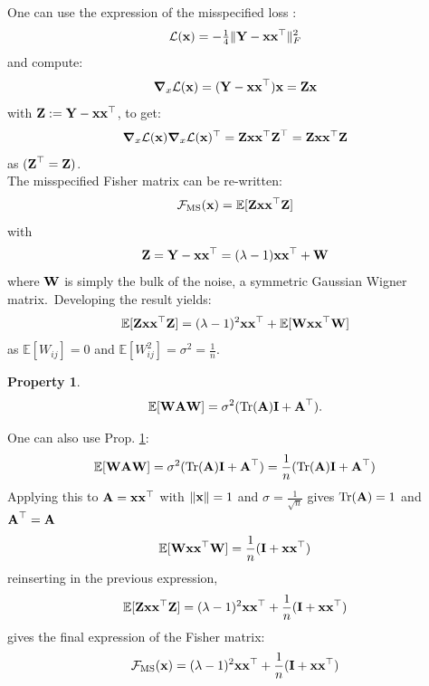 \documentclass[11pt]{article}
\newtheorem{property}{Property}
\begin{document}
\begin{rem}
One can use the expression of the misspecified loss :
\[
    \mathcal{L}(\vect{x}) = -\tfrac{1}{4} \|\vect Y - \vect{x}\vect{x}^\top\|_F^2
\]
and compute:
\[
    \vect \nabla_x \mathcal{L}(\vect{x}) = (\vect Y - \vect{x} \vect{x}^\top) \vect{x} = \vect Z\vect{x}
\]
with $\vect Z := \vect Y - \vect{x} \vect{x}^\top$, to get:
\[
    \vect \nabla_x \mathcal{L}(\vect{x}) \vect \nabla_x \mathcal{L}(\vect{x})^\top = \vect Z \vect{x} \vect{x}^\top \vect Z^\top = \vect Z \vect{x}\vect{x}^\top \vect Z
\]
as $(\vect Z^\top = \vect Z)$. \\
The misspecified Fisher matrix can be re-written:
\[
    \mathcal{F}_{\mathrm{MS}}(\vect{x}) = \mathbb{E}[\vect Z \vect{x}\vect{x}^\top \vect Z]
\]
with
\[
    \vect Z = \vect Y - \vect{x} \vect{x}^\top = (\lambda - 1) \vect{x} \vect{x}^\top + \vect W
\]
where $\vect W$ is simply the bulk of the noise, a symmetric Gaussian Wigner matrix.\
Developing the result yields:
\[
\mathbb{E} [\vect Z \vect{x} \vect{x}^\top \vect Z] = (\lambda - 1)^2 \vect{x} \vect{x}^\top + \mathbb{E}[\vect W \vect{x} \vect{x}^\top \vect W]
\]
as $\mathbb{E}[W_{ij}]=0$ and $\mathbb{E}[W_{ij}^2]=\sigma^2=\frac{1}{n}$.
\begin{property} \label{prop:wigner_expectation}
\[
    \mathbb{E}[\vect W \vect A \vect W] = \sigma^2(\mathrm{Tr}(\vect A) \vect I + \vect A^\top).
    \label{proof_tali_1}
\]
\end{property}

\noindent
One can also use Prop. \ref{prop:wigner_expectation}:
\[
    \mathbb{E}[\vect W \vect A \vect W] = \sigma^2(\mathrm{Tr}(\vect A) \vect I + \vect A^\top) = \frac{1}{n}(\mathrm{Tr}(\vect A) \vect I + \vect A^\top)
\]
\noindent
Applying this to $\vect A = \vect{x} \vect{x}^\top$ with $\|\vect{x}\| = 1$ and $\sigma = \frac{1}{\sqrt{n}}$ gives
$\mathrm{Tr}(\vect A) = 1$ and $\vect A^\top = \vect A$
\[
\mathbb{E}[\vect W \vect{x} \vect{x}^\top \vect W] = \frac{1}{n}(\vect I + \vect{x} \vect{x}^\top)
\]
reinserting in the previous expression,
\[
\mathbb{E}[\vect Z \vect{x}\vect{x}^\top \vect Z] = (\lambda-1)^2 \vect{x}\vect{x}^\top + \frac{1}{n}(\vect I + \vect{x} \vect{x}^\top)
\]
gives the final expression of the Fisher matrix:
\begin{equation}
    \mathcal{F}_{\mathrm{MS}}(\vect{x}) = (\lambda-1)^2\vect{x}\vect{x}^\top + \frac{1}{n}(\vect I + \vect{x} \vect{x}^\top)
\end{equation}


\end{rem}
\end{document}
